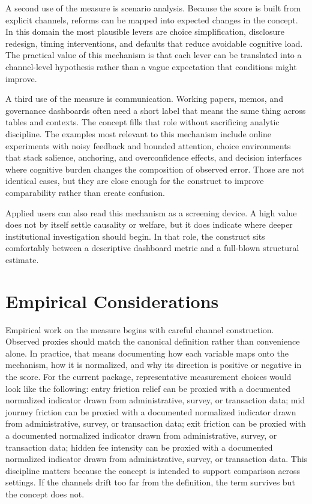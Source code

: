 \documentclass[12pt]{article}
\begin{document}
A second use of the measure is scenario analysis. Because the score is built from explicit channels, reforms can be mapped into expected changes in the concept. In this domain the most plausible levers are choice simplification, disclosure redesign, timing interventions, and defaults that reduce avoidable cognitive load. The practical value of this mechanism is that each lever can be translated into a channel-level hypothesis rather than a vague expectation that conditions might improve.

A third use of the measure is communication. Working papers, memos, and governance dashboards often need a short label that means the same thing across tables and contexts. The concept fills that role without sacrificing analytic discipline. The examples most relevant to this mechanism include online experiments with noisy feedback and bounded attention, choice environments that stack salience, anchoring, and overconfidence effects, and decision interfaces where cognitive burden changes the composition of observed error. Those are not identical cases, but they are close enough for the construct to improve comparability rather than create confusion.

Applied users can also read this mechanism as a screening device. A high value does not by itself settle causality or welfare, but it does indicate where deeper institutional investigation should begin. In that role, the construct sits comfortably between a descriptive dashboard metric and a full-blown structural estimate.

\section{Empirical Considerations}
Empirical work on the measure begins with careful channel construction. Observed proxies should match the canonical definition rather than convenience alone. In practice, that means documenting how each variable maps onto the mechanism, how it is normalized, and why its direction is positive or negative in the score. For the current package, representative measurement choices would look like the following: entry friction relief can be proxied with a documented normalized indicator drawn from administrative, survey, or transaction data; mid journey friction can be proxied with a documented normalized indicator drawn from administrative, survey, or transaction data; exit friction can be proxied with a documented normalized indicator drawn from administrative, survey, or transaction data; hidden fee intensity can be proxied with a documented normalized indicator drawn from administrative, survey, or transaction data. This discipline matters because the concept is intended to support comparison across settings. If the channels drift too far from the definition, the term survives but the concept does not.
\end{document}
